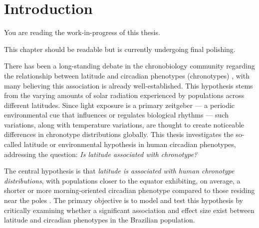 \documentclass[
12pt,
openright,
oneside,
a4paper,
chapter=TITLE,
section=TITLE,
french,
spanish,
brazil,
english
]{abntex2}\usepackage{array}
\newcommand{\microskip}{\vspace{\microskipamount}}
\renewcommand{\contentsname}{Contents}
\renewcommand{\contentsname}{Sumário}
\renewcommand{\contentsname}{Sumario}
\renewcommand{\contentsname}{Sommaire}
\renewcommand{\textual}{
  \pagestyle{abntheadings}
  \aliaspagestyle{chapter}{abntheadings}
}
\renewcommand*\contentsname{Table of contents}
\newcommand\contentsname{Table of contents}
\begin{document}

\pdfbookmark[0]{\contentsname}{toc}
\tableofcontents*
\cleardoublepage


\textual
{}

\chapter{Introduction}\label{introduction}

\begin{tcolorbox}[enhanced jigsaw, colframe=quarto-callout-note-color-frame, rightrule=.15mm, opacitybacktitle=0.6, toprule=.15mm, opacityback=0, toptitle=1mm, bottomtitle=1mm, breakable, leftrule=.75mm, title=\textcolor{quarto-callout-note-color}{\faInfo}\hspace{0.5em}{Note}, coltitle=black, bottomrule=.15mm, arc=.35mm, titlerule=0mm, left=2mm, colback=white, colbacktitle=quarto-callout-note-color!10!white]

You are reading the work-in-progress of this thesis.

\microskip

This chapter should be readable but is currently undergoing final
polishing.

\end{tcolorbox}

There has been a long-standing debate in the chronobiology community
regarding the relationship between latitude and circadian phenotypes
(chronotypes) \autocite{pittendrigh1991,zerbini2021,skeldon2021}, with
many believing this association is already well-established. This
hypothesis stems from the varying amounts of solar radiation experienced
by populations across different latitudes. Since light exposure is a
primary zeitgeber --- a periodic environmental cue that influences or
regulates biological rhythms --- such variations, along with temperature
variations, are thought to create noticeable differences in chronotype
distributions globally. This thesis investigates the so-called latitude
or environmental hypothesis in human circadian phenotypes, addressing
the question: \emph{Is latitude associated with chronotype?}

The central hypothesis is that \emph{latitude is associated with human
chronotype distributions}, with populations closer to the equator
exhibiting, on average, a shorter or more morning-oriented circadian
phenotype compared to those residing near the poles
\autocite{hut2013,leocadio-miguel2014,leocadio-miguel2017,pittendrigh1991,randler2008,randler2017,roenneberg2003}.
The primary objective is to model and test this hypothesis by critically
examining whether a significant association and effect size exist
between latitude and circadian phenotypes in the Brazilian population.
\end{document}
